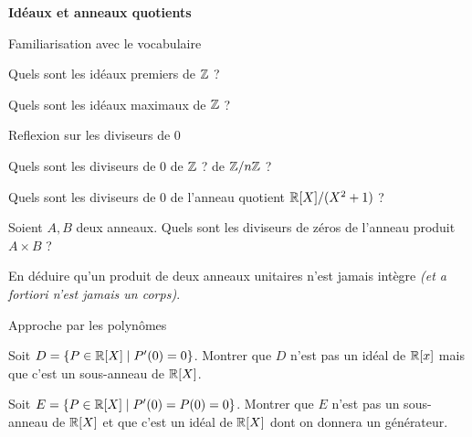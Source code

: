 \documentclass{report}
\begin{document}
\begin{center}
    \huge{\textbf{Idéaux et anneaux quotients}}
\end{center}

\begin{exo} Familiarisation avec le vocabulaire
    \begin{q}{1}
        Quels sont les idéaux premiers de \(\mathbb{Z}\) ?
    \end{q}
    \begin{q}{1}
        Quels sont les idéaux maximaux de \(\mathbb{Z}\) ?
    \end{q}
\end{exo}

\begin{exo} Reflexion sur les diviseurs de \(0\)
    \begin{q}{1}
        Quels sont les diviseurs de \(0\) de \(\mathbb{Z}\) ? de \(\mathbb{Z}/n\mathbb{Z}\) ?
    \end{q}
    \begin{q}{2}
        Quels sont les diviseurs de \(0\) de l'anneau quotient \(\mathbb{R}[X]/(X^2+1)\) ?
    \end{q}
    \begin{q}{3}
        Soient \(A,B\) deux anneaux. Quels sont les diviseurs de zéros de l'anneau
        produit \(A\times B\) ?
    \end{q}
    \begin{q}{4}
        En déduire qu'un produit de deux anneaux unitaires n'est jamais intègre
        \textit{(et a fortiori n'est jamais un corps)}.
    \end{q}
\end{exo}

\begin{exo} Approche par les polynômes
    \begin{q}{1}
        Soit \(D=\{P\in\mathbb{R}[X]\mid P'(0)=0\}\). Montrer que \(D\) n'est pas un idéal de
        \(\mathbb{R}[x]\) mais que c'est un sous-anneau de \(\mathbb{R}[X]\).
    \end{q}
    \begin{q}{2}
        Soit \(E=\{P\in\mathbb{R}[X]\mid P'(0)=P(0)=0\}\). Montrer que \(E\) n'est pas un
        sous-anneau de \(\mathbb{R}[X]\) et que c'est un idéal de \(\mathbb{R}[X]\) dont on
        donnera un générateur.
    \end{q}
\end{exo}
\end{document}
